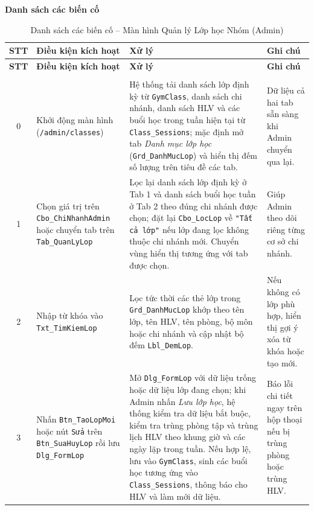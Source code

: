 \documentclass[a4paper,12pt]{article}
\begin{document}
\par\medskip\noindent\textbf{Danh sách các biến cố}\par\smallskip
{\footnotesize
\setlength{\tabcolsep}{4pt}
\begin{longtable}{|c|L{3.5cm}|L{7.8cm}|L{3.5cm}|}
\hline
\textbf{STT} & \textbf{Điều kiện kích hoạt} & \textbf{Xử lý} & \textbf{Ghi chú} \\
\hline
\endfirsthead
\hline
\textbf{STT} & \textbf{Điều kiện kích hoạt} & \textbf{Xử lý} & \textbf{Ghi chú} \\
\hline
\endhead
\hline
\endfoot
\hline
\caption{Danh sách các biến cố -- Màn hình Quản lý Lớp học Nhóm (Admin)} \\
\endlastfoot

0 & Khởi động màn hình (\texttt{/admin/classes}) &
Hệ thống tải danh sách lớp định kỳ từ \texttt{GymClass}, danh sách chi nhánh, danh sách HLV và các buổi học trong tuần hiện tại từ \texttt{Class\_Sessions}; mặc định mở tab \textit{Danh mục lớp học} (\texttt{Grd\_DanhMucLop}) và hiển thị đếm số lượng trên tiêu đề các tab. &
Dữ liệu cả hai tab sẵn sàng khi Admin chuyển qua lại. \\ \hline

1 & Chọn giá trị trên \texttt{Cbo\_ChiNhanhAdmin} hoặc chuyển tab trên \texttt{Tab\_QuanLyLop} &
Lọc lại danh sách lớp định kỳ ở Tab 1 và danh sách buổi học tuần ở Tab 2 theo đúng chi nhánh được chọn; đặt lại \texttt{Cbo\_LocLop} về \texttt{"Tất cả lớp"} nếu lớp đang lọc không thuộc chi nhánh mới. Chuyển vùng hiển thị tương ứng với tab được chọn. &
Giúp Admin theo dõi riêng từng cơ sở chi nhánh. \\ \hline

2 & Nhập từ khóa vào \texttt{Txt\_TimKiemLop} &
Lọc tức thời các thẻ lớp trong \texttt{Grd\_DanhMucLop} khớp theo tên lớp, tên HLV, tên phòng, bộ môn hoặc chi nhánh và cập nhật bộ đếm \texttt{Lbl\_DemLop}. &
Nếu không có lớp phù hợp, hiển thị gợi ý xóa từ khóa hoặc tạo mới. \\ \hline

3 & Nhấn \texttt{Btn\_TaoLopMoi} hoặc nút \texttt{Sửa} trên \texttt{Btn\_SuaHuyLop} rồi lưu \texttt{Dlg\_FormLop} &
Mở \texttt{Dlg\_FormLop} với dữ liệu trống hoặc dữ liệu lớp đang chọn; khi Admin nhấn \textit{Lưu lớp học}, hệ thống kiểm tra dữ liệu bắt buộc, kiểm tra trùng phòng tập và trùng lịch HLV theo khung giờ và các ngày lặp trong tuần. Nếu hợp lệ, lưu vào \texttt{GymClass}, sinh các buổi học tương ứng vào \texttt{Class\_Sessions}, thông báo cho HLV và làm mới dữ liệu. &
Báo lỗi chi tiết ngay trên hộp thoại nếu bị trùng phòng hoặc trùng HLV. \\ \hline


\end{longtable}}
\end{document}
